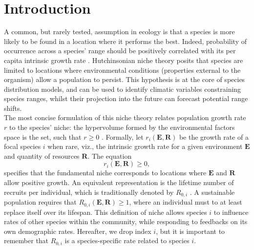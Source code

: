 

\section{Introduction}

A common, but rarely tested, assumption in ecology is that a species is more likely to be found in a location where it performs the best. Indeed, probability of occurrence across a species' range should be positively correlated with its per capita intrinsic growth rate \citep{McGill2012}. Hutchinsonian niche theory \citep{Hutchinson1957, Maguire1973} posits that species are limited to locations where environmental conditions (\ie properties external to the organism) allow a population to persist. This hypothesis is at the core of species distribution models, and can be used to identify climatic variables constraining species ranges, whilst their projection into the future can forecast potential range shifts. \\

The most concise formulation of this niche theory relates population growth rate $ r $ to the species' niche: the hypervolume formed by the environmental factors space is the set, such that $ r \geqslant 0 $ \citep{Holt2009, Godsoe2017}. Formally, let $ r_i(\bm{E}, \bm{R}) $ be the growth rate of a focal species $ i $ when rare, viz., the intrinsic growth rate for a given environment $ \bm{E} $ and quantity of resources $ \bm{R} $. The equation
\[
	r_i(\bm{E}, \bm{R}) \geqslant 0,
\]
specifies that the fundamental niche corresponds to locations where $ \bm{E} $ and $ \bm{R} $ allow positive growth. An equivalent representation is the lifetime number of recruits per individual, which is traditionally denoted by $ R_{0, i} $ \citep[where $ i $ is still the species index]{Pulliam2000, DeRoos1997}. A sustainable population requires that $ R_{0, i} (\bm{E}, \bm{R}) \geqslant 1 $, where an individual must to at least replace itself over its lifespan. This definition of niche allows species $ i $ to influence rates of other species within the community, while responding to feedbacks on its own demographic rates. Hereafter, we drop index $ i $, but it is important to remember that $ R_{0, i} $ is a species-specific rate related to species $ i $. \\

